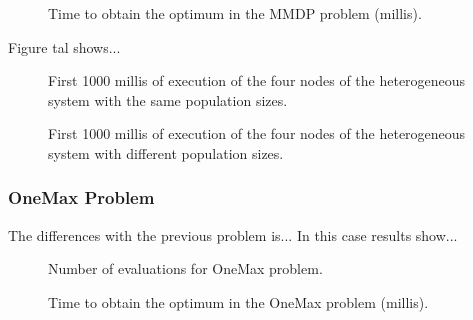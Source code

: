 \documentclass{sig-alternate}
\begin{document}
\begin{figure}
\centering
{}
\caption{Time to obtain the optimum in the MMDP problem (millis).}
\end{figure}

Figure tal shows...

\begin{figure*}
\centering
{}
\caption{First 1000 millis of execution of the four nodes of the heterogeneous system with the same population sizes.}
\end{figure*}

\begin{figure*}
\centering
{}
\caption{First 1000 millis of execution of the four nodes of the heterogeneous system with different population sizes.}
\end{figure*}

\subsubsection{OneMax Problem}

The differences with the previous problem is... In this case results show...

\begin{figure}
\centering
{}
\caption{Number of evaluations for OneMax problem.}
\end{figure}

\begin{figure}
\centering
{}
\caption{Time to obtain the optimum in the OneMax problem (millis).}
\end{figure}


\end{document}
